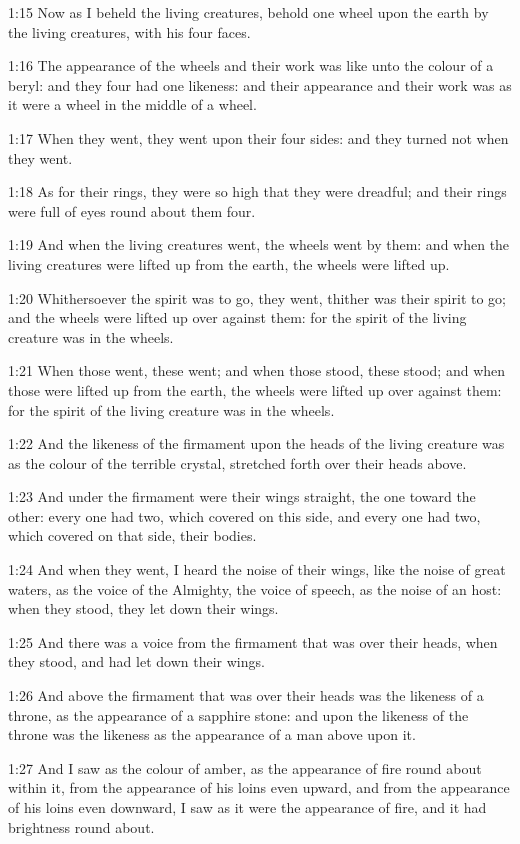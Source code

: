 1:15 Now as I beheld the living creatures, behold one wheel upon the
earth by the living creatures, with his four faces.

1:16 The appearance of the wheels and their work was like unto the
colour of a beryl: and they four had one likeness: and their
appearance and their work was as it were a wheel in the middle of a
wheel.

1:17 When they went, they went upon their four sides: and they turned
not when they went.

1:18 As for their rings, they were so high that they were dreadful;
and their rings were full of eyes round about them four.

1:19 And when the living creatures went, the wheels went by them: and
when the living creatures were lifted up from the earth, the wheels
were lifted up.

1:20 Whithersoever the spirit was to go, they went, thither was their
spirit to go; and the wheels were lifted up over against them: for the
spirit of the living creature was in the wheels.

1:21 When those went, these went; and when those stood, these stood;
and when those were lifted up from the earth, the wheels were lifted
up over against them: for the spirit of the living creature was in the
wheels.

1:22 And the likeness of the firmament upon the heads of the living
creature was as the colour of the terrible crystal, stretched forth
over their heads above.

1:23 And under the firmament were their wings straight, the one toward
the other: every one had two, which covered on this side, and every
one had two, which covered on that side, their bodies.

1:24 And when they went, I heard the noise of their wings, like the
noise of great waters, as the voice of the Almighty, the voice of
speech, as the noise of an host: when they stood, they let down their
wings.

1:25 And there was a voice from the firmament that was over their
heads, when they stood, and had let down their wings.

1:26 And above the firmament that was over their heads was the
likeness of a throne, as the appearance of a sapphire stone: and upon
the likeness of the throne was the likeness as the appearance of a man
above upon it.

1:27 And I saw as the colour of amber, as the appearance of fire round
about within it, from the appearance of his loins even upward, and
from the appearance of his loins even downward, I saw as it were the
appearance of fire, and it had brightness round about.


